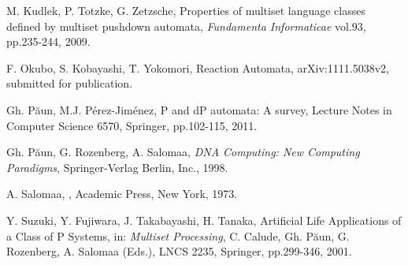\documentclass[preprint,fleqn,1p]{elsarticle}
\begin{document}
\begin{thebibliography}{00}
M. Kudlek, P. Totzke, G. Zetzsche,  
\newblock Properties of multiset language classes defined by multiset pushdown automata, {\it Fundamenta Informaticae}  vol.93,  pp.235-244, 2009.

F. Okubo, S. Kobayashi, T. Yokomori,   
\newblock Reaction Automata, arXiv:1111.5038v2, submitted for publication.


Gh. P\u aun, M.J. P\'erez-Jim\' enez,  P and dP automata: A survey, Lecture Notes in Computer Science 6570, Springer, pp.102-115, 2011. 

Gh. P\u aun, G. Rozenberg, A. Salomaa, {\it DNA Computing: New Computing Paradigms}, Springer-Verlag Berlin, Inc., 1998.

A. Salomaa,   
, Academic Press, New York, 1973.



Y. Suzuki, Y. Fujiwara, J. Takabayashi, H. Tanaka,  
\newblock Artificial Life Applications of a Class of P Systems, in: {\it Multiset Processing}, C. Calude, Gh. P\u aun, G. Rozenberg, A. Salomaa (Eds.), LNCS 2235, 
Springer,  pp.299-346, 2001.

\end{thebibliography}
\end{document}

